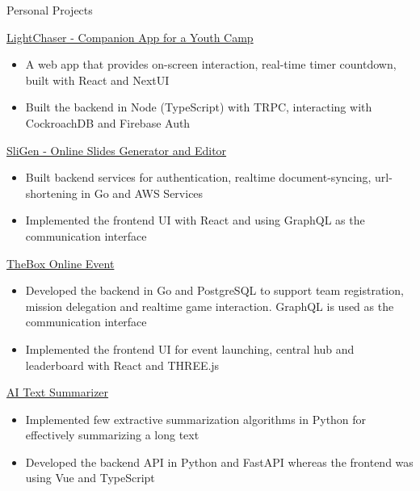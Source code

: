 \documentclass{article}
\newlength{\tabin}
\newlength{\secsep}
\newcommand{\lineunder}{\vspace*{-8pt} \\ \hspace*{-6pt} \hrulefill \\ \vspace*{-15pt}}
\newenvironment{tabbedsection}[1]{
  \begin{list}{}{
      \setlength{\itemsep}{0pt}
      \setlength{\labelsep}{0pt}
      \setlength{\labelwidth}{0pt}
      \setlength{\leftmargin}{\tabin}
      \setlength{\rightmargin}{\tabin}
      \setlength{\listparindent}{0pt}
      \setlength{\parsep}{0pt}
      \setlength{\parskip}{0pt}
      \setlength{\partopsep}{0pt}
      \setlength{\topsep}{#1}
    }
  \item[]
}{\end{list}}
\newenvironment{resume_section}[1]{
  \filbreak
  \vspace{2\secsep}
  \textsc{\large#1}
  \lineunder
  \begin{tabbedsection}{\secsep}
}{\end{tabbedsection}}
\newenvironment{resume_subsection}[2][]{
  \textbf{#2} \hfill {\footnotesize #1} \hspace{2em}
  \begin{tabbedsection}{0.5\secsep}
}{\end{tabbedsection}}
\newenvironment{subitems}{
  \renewcommand{\labelitemi}{-}
  \begin{itemize}
      \setlength{\labelsep}{1em}
}{\end{itemize}}
\begin{document}
\begin{resume_section}{Personal Projects}
  \begin{resume_subsection}[(April 2022)]{\href{https://github.com/marcustut/lightchaser}{LightChaser - Companion App for a Youth Camp}}
    \begin{subitems}
      \item A web app that provides on-screen interaction, real-time timer countdown, built with React and NextUI
      \item Built the backend in Node (TypeScript) with TRPC, interacting with CockroachDB and Firebase Auth
    \end{subitems}
  \end{resume_subsection}

  \begin{resume_subsection}{\href{https://github.com/marcustut/fyp}{SliGen - Online Slides Generator and Editor}}
    \begin{subitems}
      \item Built backend services for authentication, realtime document-syncing, url-shortening in Go and AWS Services
      \item Implemented the frontend UI with React and using GraphQL as the communication interface
    \end{subitems}
  \end{resume_subsection}


  \begin{resume_subsection}{\href{https://github.com/marcustut/thebox}{TheBox Online Event}}
    \begin{subitems}
      \item Developed the backend in Go and PostgreSQL to support team registration, mission delegation and realtime game interaction. GraphQL is used as the communication interface
      \item Implemented the frontend UI for event launching, central hub and leaderboard with React and THREE.js
    \end{subitems}
  \end{resume_subsection}

  \begin{resume_subsection}{\href{https://github.com/marcustut/summarize}{AI Text Summarizer}}
    \begin{subitems}
      \item Implemented few extractive summarization algorithms in Python for effectively summarizing a long text
      \item Developed the backend API in Python and FastAPI whereas the frontend was using Vue and TypeScript
    \end{subitems}
  \end{resume_subsection}


\end{resume_section}
\end{document}
